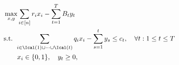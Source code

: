 \documentclass[11pt]{article}
\begin{document}
\begin{comment}
\begin{equation}\label{MPBKP-S}
\begin{aligned}
\max_{x \in \{0,1\}^n} z(x) :=&\sum_{i=1}^nr_ix_i - B\cdot \Bigg\{\bigg[\sum_{j\in \mathcal{I}(1)}q_jx_j-c_1\bigg]^+ \\&+ \bigg[\sum_{j\in \mathcal{I}(2)}q_jx_j-\Big(c_1-\sum_{j\in \mathcal{I}(1)}q_jx_j\Big)^+-(c_2-c_1)\bigg]^++\cdots\Bigg\}
\end{aligned}
\end{equation}
where $\left[a\right]^+$ is the maximum of $a$ and $0$. In the objective function, $\sum_{j\in \mathcal{I}(1)}q_jx_j$ is the total size of selected items with deadline~$1$, and $c_1$ is the capacity for time $1$, thus $B\cdot \left[\sum_{j\in \mathcal{I}(1)}q_jx_j-c_1\right]^+ $ is the penalty generated at time~$1$. Similarly, $\sum_{j\in \mathcal{I}(2)}q_jx_j$ is the total size of selected items with deadline~$2$, $c_2-c_1$ is the incremental capacity from time~$1$ to time~$2$, and $\left(c_1-\sum_{j\in \mathcal{I}(1)}q_jx_j\right)^+$ is the leftover capacity (if any) carried from time~$1$, thus $B\cdot \left[\sum_{j\in \mathcal{I}(2)}q_jx_j-\left(c_1-\sum_{j\in \mathcal{I}(1)}q_jx_j\right)^+-(c_2-c_1)\right]^+$ is the penalty generated at time~$2$. We continue this pattern and write out the penalties generated at each time.



An equivalent expression
of~\eqref{MPBKP-S} is the following.
\begin{equation}\label{MPBKP-S2}
\begin{aligned}
&\max_{x \in\{0,1\}^n} z(x) :=\sum_{i=1}^nr_ix_i - B\cdot \sum_{t=1}^T\left[\sum_{j\in \mathcal{I}(t)}q_jx_j-\max_{0\leq t' < t}\left\{ c_t - c_{t'}-\sum_{j  \in \Scal : t'+1 \leq d_j \leq t-1} q_j x_j\right\}\right]^+ .
\end{aligned}
\end{equation}
Further, if we add decision variables $y_t, t=1,\ldots, T$, which represents the overflow at time $t$, then the problem can be written as
\end{comment}
\begin{subequations}\label{MPBKP-S3}
	\begin{align}
	&\max_{x,y} \sum_{i\in[n]}r_ix_i - \sum_{t=1}^TB_ty_t\\
	&\text{s.t. } \sum_{i\in\Ical(1)\cup\cdots\cup\Ical(t)}q_ix_i - \sum_{s=1}^ty_s \le c_t,\quad \forall t: 1\le t\le T\\
	&\qquad x_i\in\{0,1\},\quad y_t\ge 0,
	\end{align}
\end{subequations}
\end{document}

